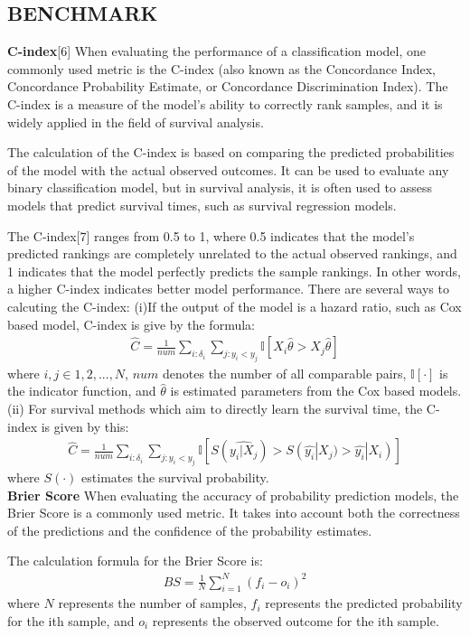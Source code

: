 \documentclass[conference]{IEEEconf}
\begin{document}
\subsection{BENCHMARK}
\textbf{C-index}[6] When evaluating the performance of a classification model, one commonly used metric is the C-index (also known as the Concordance Index, Concordance Probability Estimate, or Concordance Discrimination Index). The C-index is a measure of the model's ability to correctly rank samples, and it is widely applied in the field of survival analysis.

The calculation of the C-index is based on comparing the predicted probabilities of the model with the actual observed outcomes. It can be used to evaluate any binary classification model, but in survival analysis, it is often used to assess models that predict survival times, such as survival regression models.

The C-index[7] ranges from 0.5 to 1, where 0.5 indicates that the model's predicted rankings are completely unrelated to the actual observed rankings, and 1 indicates that the model perfectly predicts the sample rankings. In other words, a higher C-index indicates better model performance.
There are several ways to calcuting the C-index:
(i)If the output of the model is a hazard ratio, such as Cox based model, C-index is give by the formula: 
\begin{eqnarray}
	\hat{C}=\frac{1}{num}\sum_{i:\delta_{i}}^{}\sum_{j:y_{i}<y_{j}}^{}\mathbb{I}[X_{i}\hat{\theta}>X_{j}\hat{\theta}]
\end{eqnarray}
where $i,j\in{1,2,...,N}$, $num$ denotes the number of all comparable pairs, $\mathbb{I}[\cdot]$ is the indicator function, and $\hat{\theta}$ is estimated parameters from the Cox based models.
(ii) For survival methods which aim to directly learn the survival time, the C-index is given by this:
\begin{eqnarray}
	\hat{C}=\frac{1}{num}\sum_{i:\delta_{i}}^{}\sum_{j:y_{i}<y_{j}}^{}\mathbb{I}[S(\hat{y_{i}|X_{j}})>S(\hat{y_{i}}|X_{j})>\hat{y_{i}}|X_{i})]
\end{eqnarray}
where $S(\cdot)$ estimates the survival probability.\\

\textbf{Brier Score} When evaluating the accuracy of probability prediction models, the Brier Score is a commonly used metric. It takes into account both the correctness of the predictions and the confidence of the probability estimates.

The calculation formula for the Brier Score is:
\begin{eqnarray}
	BS = \frac{1}{N} \sum_{i=1}^{N} (f_i - o_i)^2
\end{eqnarray}
where $N$ represents the number of samples, $f_{i}$ represents the predicted probability for the ith sample, and $o_{i}$ represents the observed outcome for the ith sample.
\end{document}
